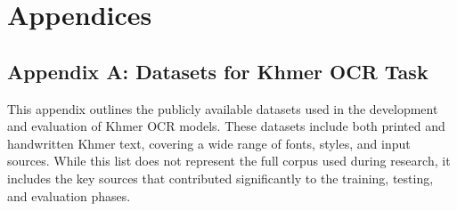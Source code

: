 \appendix
\chapter*{Appendices}

\vspace{-1cm}
\setlength{\parindent}{0pt}
\vspace{0.3cm}

\label{appendix-a}
\section*{Appendix A: Datasets for Khmer OCR Task}

This appendix outlines the publicly available datasets used in the development and evaluation of Khmer OCR models. These datasets include both printed and handwritten Khmer text, covering a wide range of fonts, styles, and input sources. While this list does not represent the full corpus used during research, it includes the key sources that contributed significantly to the training, testing, and evaluation phases.


